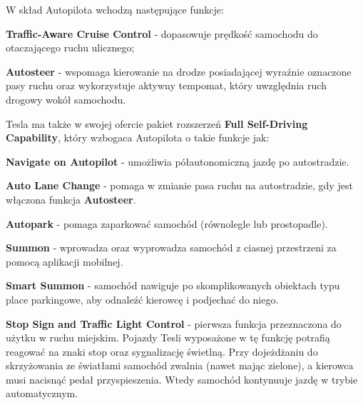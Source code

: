 W skład Autopilota wchodzą następujące funkcje:
\begin{enumerate*}
\item \textbf{Traffic-Aware Cruise Control} - dopasowuje prędkość samochodu do otaczającego ruchu ulicznego;
\item \textbf{Autosteer} - wspomaga kierowanie na drodze posiadającej wyraźnie oznaczone pasy ruchu oraz wykorzystuje aktywny tempomat, który uwzględnia ruch drogowy wokół samochodu.
\end{enumerate*}

Tesla ma także w swojej ofercie pakiet rozszerzeń \textbf{Full Self-Driving Capability}, który wzbogaca Autopilota o takie funkcje jak:
\vspace{-0.25cm}
\begin{enumerate*}
\item \textbf{Navigate on Autopilot} - umożliwia półautonomiczną jazdę po autostradzie.
\item \textbf{Auto Lane Change} - pomaga w zmianie pasa ruchu na autostradzie, gdy jest włączona funkcja \textbf{Autosteer}.
\item \textbf{Autopark} - pomaga zaparkować samochód (równolegle lub prostopadle).
\item \textbf{Summon} - wprowadza oraz wyprowadza samochód z ciasnej przestrzeni za pomocą aplikacji mobilnej.
\item \textbf{Smart Summon} - samochód nawiguje po skomplikowanych obiektach typu place parkingowe, aby odnaleźć kierowcę i podjechać do niego.
\item \textbf{Stop Sign and Traffic Light Control} - pierwsza funkcja przeznaczona do użytku w ruchu miejskim. Pojazdy Tesli wyposażone w tę funkcję potrafią reagować na znaki stop oraz sygnalizację świetlną. Przy dojeżdżaniu do skrzyżowania ze światłami samochód zwalnia (nawet mając zielone), a kierowca musi nacisnąć pedał przyspieszenia. Wtedy samochód kontynuuje jazdę w trybie automatycznym.
\end{enumerate*}

